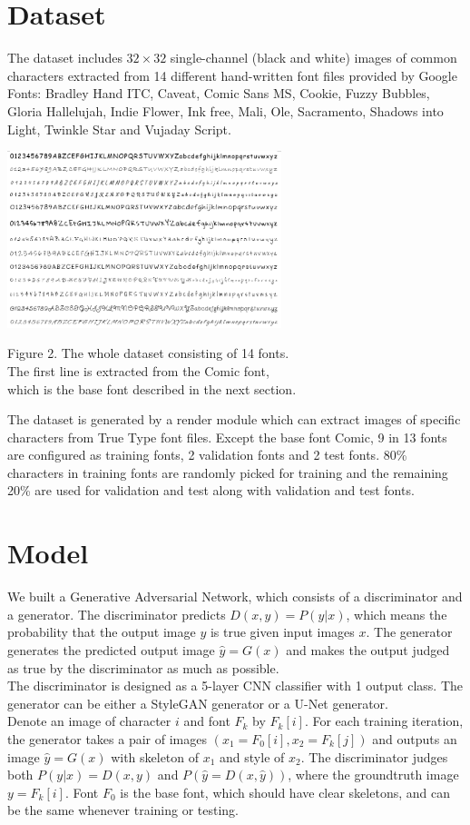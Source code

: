 \documentclass[letterpaper]{article}
\begin{document}
\section{Dataset}
The dataset includes $32 \times 32$ single-channel (black and white) images of common characters extracted from 14 different hand-written font files provided by Google Fonts: Bradley Hand ITC, Caveat, Comic Sans MS, Cookie, Fuzzy Bubbles, Gloria Hallelujah, Indie Flower, Ink free, Mali, Ole, Sacramento, Shadows into Light, Twinkle Star and Vujaday Script.
\begin{center}
    \includegraphics[width=8cm]{report-fig-dataset.png}

    Figure 2. The whole dataset consisting of 14 fonts.\\The first line is extracted from the Comic font,\\ which is the base font described in the next section.
\end{center}
The dataset is generated by a render module which can extract images of specific characters from True Type font files. Except the base font Comic, 9 in 13 fonts are configured as training fonts, 2 validation fonts and 2 test fonts. 80\% characters in training fonts are randomly picked for training and the remaining 20\% are used for validation and test along with validation and test fonts.

\section{Model}
We built a Generative Adversarial Network, which consists of a discriminator and a generator. The discriminator predicts $D(x,y)=P(y|x)$, which means the probability that the output image $y$ is true given input images $x$. The generator generates the predicted output image $\hat{y}=G(x)$ and makes the output judged as true by the discriminator as much as possible.
\\
The discriminator is designed as a 5-layer CNN classifier with 1 output class. The generator can be either a StyleGAN generator or a U-Net generator.
\\
Denote an image of character $i$ and font $F_k$ by $F_k[i]$. For each training iteration, the generator takes a pair of images $(x_1=F_0[i], x_2=F_k[j])$ and outputs an image $\hat{y}=G(x)$ with skeleton of $x_1$ and style of $x_2$. The discriminator judges both $P(y|x)=D(x,y)$ and $P(\hat{y}=D(x,\hat{y}))$, where the groundtruth image $y=F_k[i]$. Font $F_0$ is the base font, which should have clear skeletons, and can be the same whenever training or testing.
\end{document}
